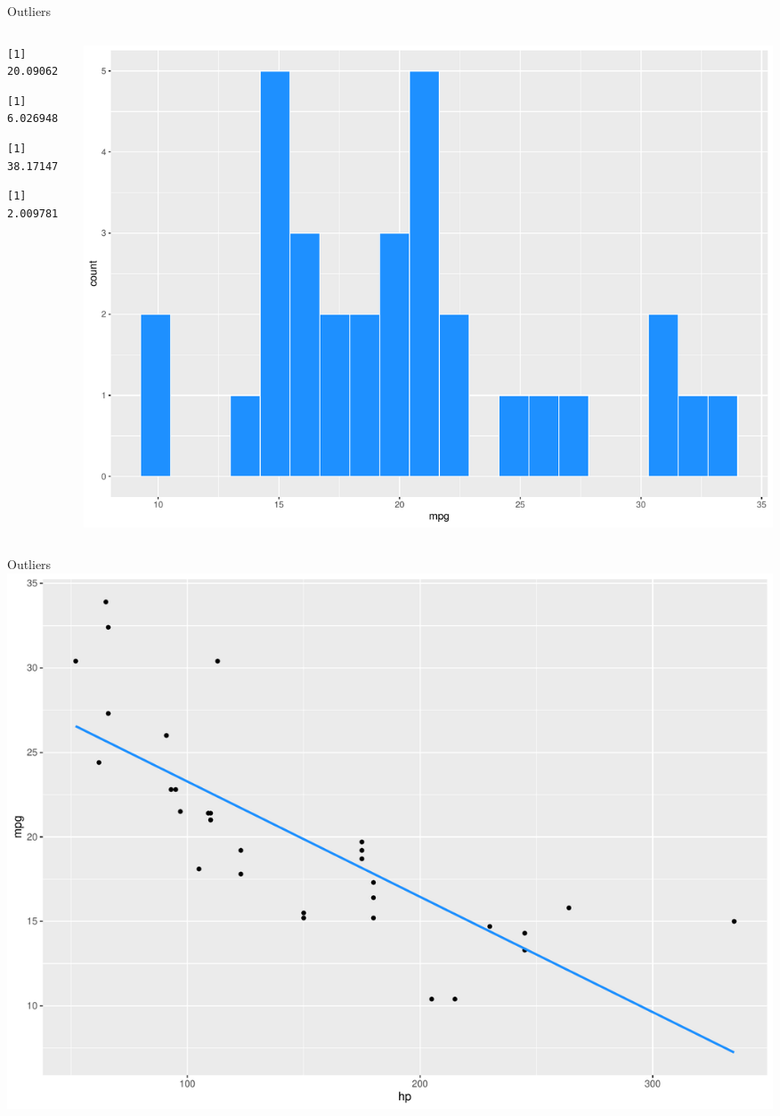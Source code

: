\documentclass[
  ignorenonframetext,
]{beamer}
\begin{document}
\begin{frame}[fragile]{Outliers}
\protect\hypertarget{outliers-1}{}
\begin{columns}[T]
\begin{column}{0.3\textwidth}
\begin{verbatim}
[1] 20.09062
\end{verbatim}

\begin{verbatim}
[1] 6.026948
\end{verbatim}

\begin{verbatim}
[1] 38.17147
\end{verbatim}

\begin{verbatim}
[1] 2.009781
\end{verbatim}
\end{column}

\begin{column}{0.7\textwidth}
\includegraphics{bias_files/figure-beamer/unnamed-chunk-4-1.pdf}
\end{column}
\end{columns}
\end{frame}

\begin{frame}{Outliers}
\protect\hypertarget{outliers-2}{}
\includegraphics{bias_files/figure-beamer/unnamed-chunk-6-1.pdf}
\end{frame}
\end{document}
